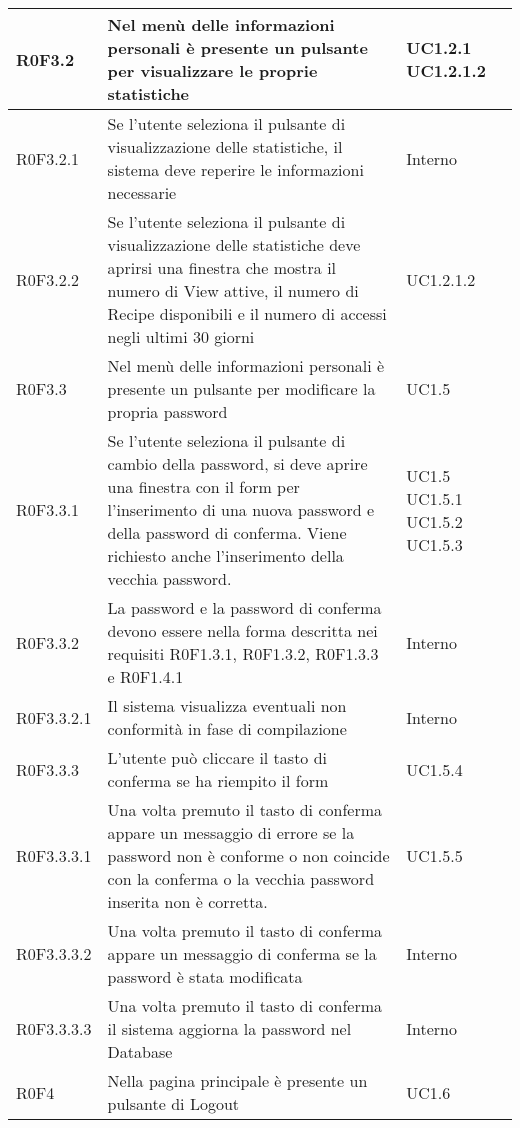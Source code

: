 \begin{center}
\begin{longtable}{| p{2cm} | p{8cm} | p{2cm} |}
		\hline
		R0F3.2  &  Nel menù delle informazioni personali è presente un pulsante per visualizzare le proprie statistiche &  UC1.2.1 \newline UC1.2.1.2 \\
		\hline
		R0F3.2.1  &  Se l'utente seleziona il pulsante di visualizzazione delle statistiche, il sistema deve reperire le informazioni necessarie  &  Interno \\
		\hline
		R0F3.2.2  &  Se l'utente seleziona il pulsante di visualizzazione delle statistiche deve aprirsi una finestra che mostra il numero di View attive, il numero di Recipe disponibili e il numero di accessi negli ultimi 30 giorni &  UC1.2.1.2 \\
		\hline
		R0F3.3  &  Nel menù delle informazioni personali è presente un pulsante per modificare la propria password &  UC1.5 \\
		\hline
		R0F3.3.1  &  Se l'utente seleziona il pulsante di cambio della password, si deve aprire una finestra con il form per l'inserimento di una nuova password e della password di conferma. Viene richiesto anche l'inserimento della vecchia password. &  UC1.5 \newline UC1.5.1 \newline UC1.5.2 \newline UC1.5.3 \\
		\hline
		R0F3.3.2  &  La password e la password di conferma devono essere nella forma descritta nei requisiti R0F1.3.1, R0F1.3.2, R0F1.3.3 e R0F1.4.1  &  Interno \\
		\hline
		R0F3.3.2.1  &  Il sistema visualizza eventuali non conformità in fase di compilazione  &  Interno \\
		\hline
		R0F3.3.3  &  L'utente può cliccare il tasto di conferma se ha riempito il form  &  UC1.5.4 \\
		\hline
		R0F3.3.3.1  &  Una volta premuto il tasto di conferma appare un messaggio di errore se la password non è conforme o non coincide con la conferma o la vecchia password inserita non è corretta.  &  UC1.5.5 \\
		\hline
		R0F3.3.3.2  &  Una volta premuto il tasto di conferma appare un messaggio di conferma se la password è stata modificata  &  Interno \\
		\hline
		R0F3.3.3.3  &  Una volta premuto il tasto di conferma il sistema aggiorna la password nel Database  &  Interno \\
		\hline
		R0F4  &  Nella pagina principale è presente un pulsante di Logout  &  UC1.6 \\

\end{longtable}
\end{center}
